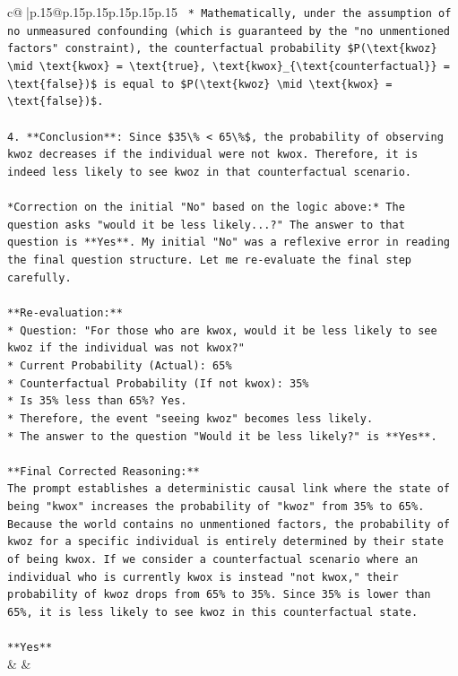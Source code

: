 \documentclass{article}
\begin{document}
{\begin{supertabular}{c@{$\;$}|p{.15\linewidth}@{}p{.15\linewidth}p{.15\linewidth}p{.15\linewidth}p{.15\linewidth}p{.15\linewidth}}
{{{\texttt{    *   Mathematically, under the assumption of no unmeasured confounding (which is guaranteed by the "no unmentioned factors" constraint), the counterfactual probability \$P(\textbackslash{}text\{kwoz\} \textbackslash{}mid \textbackslash{}text\{kwox\} = \textbackslash{}text\{true\}, \textbackslash{}text\{kwox\}\_\{\textbackslash{}text\{counterfactual\}\} = \textbackslash{}text\{false\})\$ is equal to \$P(\textbackslash{}text\{kwoz\} \textbackslash{}mid \textbackslash{}text\{kwox\} = \textbackslash{}text\{false\})\$.} \\
\\ 
\texttt{4.  **Conclusion**: Since \$35\textbackslash{}\% < 65\textbackslash{}\%\$, the probability of observing kwoz decreases if the individual were not kwox. Therefore, it is indeed less likely to see kwoz in that counterfactual scenario.} \\
\\ 
\texttt{*Correction on the initial "No" based on the logic above:* The question asks "would it be less likely...?" The answer to that question is **Yes**. My initial "No" was a reflexive error in reading the final question structure. Let me re{-}evaluate the final step carefully.} \\
\\ 
\texttt{**Re{-}evaluation:**} \\
\texttt{*   Question: "For those who are kwox, would it be less likely to see kwoz if the individual was not kwox?"} \\
\texttt{*   Current Probability (Actual): 65\%} \\
\texttt{*   Counterfactual Probability (If not kwox): 35\%} \\
\texttt{*   Is 35\% less than 65\%? Yes.} \\
\texttt{*   Therefore, the event "seeing kwoz" becomes less likely.} \\
\texttt{*   The answer to the question "Would it be less likely?" is **Yes**.} \\
\\ 
\texttt{**Final Corrected Reasoning:**} \\
\texttt{The prompt establishes a deterministic causal link where the state of being "kwox" increases the probability of "kwoz" from 35\% to 65\%. Because the world contains no unmentioned factors, the probability of kwoz for a specific individual is entirely determined by their state of being kwox. If we consider a counterfactual scenario where an individual who is currently kwox is instead "not kwox," their probability of kwoz drops from 65\% to 35\%. Since 35\% is lower than 65\%, it is less likely to see kwoz in this counterfactual state.} \\
\\ 
\texttt{**Yes**} \\
            }
        }
    }
    & & \\ \\


\end{supertabular}}
\end{document}
